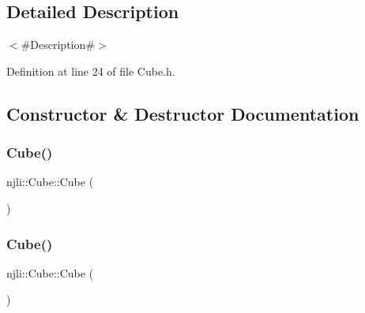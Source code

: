 \subsection{Detailed Description}
$<$\#\+Description\#$>$ 

Definition at line 24 of file Cube.\+h.



\subsection{Constructor \& Destructor Documentation}
\mbox{\label{classnjli_1_1_cube_a5535d8b421b251568aa2683e68565ae2}} 
\subsubsection{\texorpdfstring{Cube()}{Cube()}\hspace{0.1cm}{\footnotesize\ttfamily [1/3]}}
{\footnotesize\ttfamily njli\+::\+Cube\+::\+Cube (\begin{DoxyParamCaption}{ }\end{DoxyParamCaption})\hspace{0.3cm}{\ttfamily [protected]}}

\mbox{\label{classnjli_1_1_cube_a13c6574a55b74a5a67924faa3936f038}} 
\subsubsection{\texorpdfstring{Cube()}{Cube()}\hspace{0.1cm}{\footnotesize\ttfamily [2/3]}}
{\footnotesize\ttfamily njli\+::\+Cube\+::\+Cube (\begin{DoxyParamCaption}\item[{const \mbox{\hyperlink{classnjli_1_1_abstract_builder}{Abstract\+Builder}} \&}]{ }\end{DoxyParamCaption})\hspace{0.3cm}{\ttfamily [protected]}}

\mbox{\label{classnjli_1_1_cube_a5a3ed8352356dd46e9ed33768bf668c5}} 
